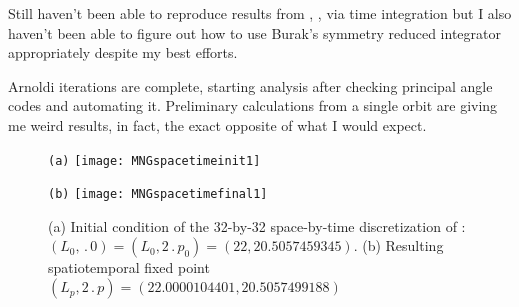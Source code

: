 \begin{description}
{\begin{description}
Still haven't been able to reproduce results from , ,
via time integration but I also haven't been able to figure out how to use Burak's symmetry reduced integrator appropriately despite
my best efforts.

\item[Floquet vectors]
Arnoldi iterations are complete, starting analysis after checking principal angle codes and automating it.
Preliminary calculations from a single orbit are giving me weird results, in fact, the exact opposite of what
I would expect.
\end{description}
}


\begin{figure}[ht]
\begin{minipage}[height=.32\textheight]{.45\textwidth}
\centering \small{\texttt{(a)}}
\texttt{[image: MNGspacetimeinit1]}
\end{minipage}
\begin{minipage}[height=.32\textheight]{.45\textwidth}
\centering \small{\texttt{(b)}}
\texttt{[image: MNGspacetimefinal1]}
\end{minipage}
\caption{ \label{fig:MNGspacetime11}
(a) Initial condition of the 32-by-32 space-by-time discretization of :
$(L_0,\period{0}) = (L_0, 2\period{p_0})= (22,20.5057459345)$.
(b) Resulting spatiotemporal fixed point
$(L_p,2\period{p}) =  (22.0000104401, 20.5057499188)$
}
\end{figure}




\end{description}
